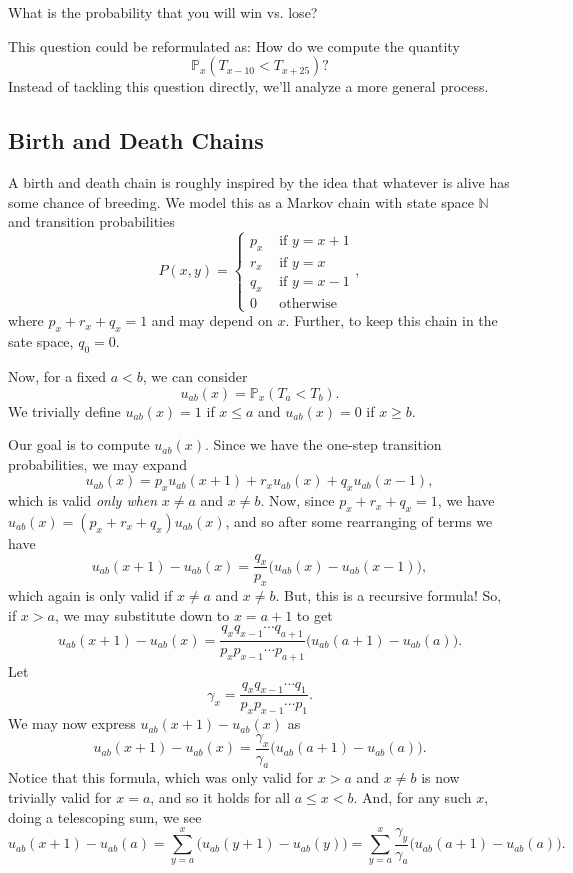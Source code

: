 \documentclass{problemset}
\newcommand{\N}{\mathbb{N}}
\renewcommand{\P}{\mathbb{P}}
\begin{document}
	What is the probability that you will win vs\mbox{.} lose?

	This question could be reformulated as: How do we compute the quantity
	\[
		\P_x(T_{x-10} < T_{x+25})?
	\]
	Instead of tackling this question directly, we'll analyze a more general process.

\subsection*{Birth and Death Chains}
	A birth and death chain is roughly inspired by the idea that whatever is alive
	has some chance of breeding.  We model this as a Markov chain with state space $\N$
	and transition probabilities
	\[
		P(x,y) = \begin{cases}
			p_x &\text{ if }y=x+1\\
			r_x &\text{ if }y=x\\
			q_x &\text{ if }y=x-1\\
			0 &\text{ otherwise }
		\end{cases},
	\]
	where $p_x+r_x+q_x=1$ and may depend on $x$.  Further, to keep this chain in the sate space, $q_0=0$.

	Now, for a fixed $a<b$, we can consider
	\[
		u_{ab}(x) = \P_x(T_a < T_b).
	\]
	We trivially define $u_{ab}(x) = 1$ if $x\leq a$ and $u_{ab}(x)=0$ if $x\geq b$.

	Our goal is to compute $u_{ab}(x)$.  Since we have the one-step transition
	probabilities, we may expand
	\[
		u_{ab}(x) = p_xu_{ab}(x+1)+r_xu_{ab}(x)+q_xu_{ab}(x-1),
	\]
	which is valid \emph{only when} $x\neq a$ and $x\neq b$.  Now, since $p_x+r_x+q_x=1$, 
	we have $u_{ab}(x)  = (p_x+r_x+q_x)u_{ab}(x)$, and so after some rearranging of terms
	we have
	\[
		u_{ab}(x+1)-u_{ab}(x) = \frac{q_x}{p_x}\Big(u_{ab}(x)-u_{ab}(x-1)\Big),
	\]
	which again is only valid if $x\neq a$ and $x\neq b$.  But, this is a recursive formula!
	So, if $x>a$, we may substitute down to $x=a+1$ to get
	\[
		u_{ab}(x+1)-u_{ab}(x) = \frac{q_xq_{x-1}\cdots q_{a+1}}{p_xp_{x-1}\cdots p_{a+1}}\Big(u_{ab}(a+1)-u_{ab}(a)\Big).
	\]
	Let
	\[
		\gamma_x = \frac{q_xq_{x-1}\cdots q_{1}}{p_xp_{x-1}\cdots p_{1}}.
	\]
	We may now express $u_{ab}(x+1)-u_{ab}(x)$ as
	\[
		u_{ab}(x+1)-u_{ab}(x) = \frac{\gamma_x}{\gamma_a}\Big(u_{ab}(a+1)-u_{ab}(a)\Big).
	\]
	Notice that this formula, which was only valid for $x> a$ and $x\neq b$ is now trivially valid for $x=a$, 
	and so it holds for all $a\leq x < b$.  And, for any such $x$, doing a telescoping sum, we see
	\[
		u_{ab}(x+1)-u_{ab}(a) = \sum_{y=a}^x \Big(u_{ab}(y+1)-u_{ab}(y)\Big) = \sum_{y=a}^x \frac{\gamma_y}{\gamma_a}\Big(u_{ab}(a+1)-u_{ab}(a)\Big).
	\]
\end{document}

